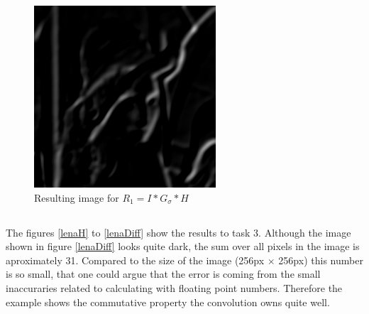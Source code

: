 \documentclass{article}
\begin{document}
\begin{figure}[H]
	\begin{center}
		\includegraphics[width=\textwidth]{./images/imR1}
		\caption{Resulting image for $R_1 = I * G_{\sigma} * H$} 
    \label{lenaR1}
	\end{center}
\end{figure}

\subsection{}
The figures \ref{lenaH} to \ref{lenaDiff} show the results to task 3. Although the image shown in figure \ref{lenaDiff} looks quite dark, the sum over all pixels in the image is aproximately 31. Compared to the size of the image (256px $\times$ 256px) this number is so small, that one could argue that the error is coming from the small inaccuraries related to calculating with floating point numbers. 
Therefore the example shows the commutative property the convolution owns quite well. 
\end{document}
